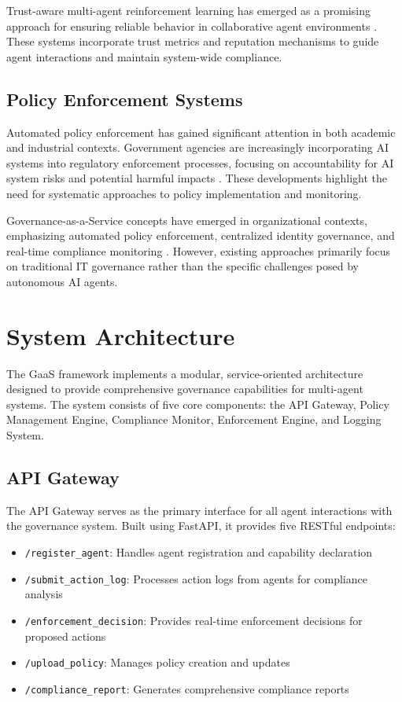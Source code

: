 \documentclass[letterpaper]{article}
\begin{document}
Trust-aware multi-agent reinforcement learning has emerged as a promising approach for ensuring reliable behavior in collaborative agent environments \cite{trust2024marl}. These systems incorporate trust metrics and reputation mechanisms to guide agent interactions and maintain system-wide compliance.

\subsection{Policy Enforcement Systems}

Automated policy enforcement has gained significant attention in both academic and industrial contexts. Government agencies are increasingly incorporating AI systems into regulatory enforcement processes, focusing on accountability for AI system risks and potential harmful impacts \cite{gov2024ai}. These developments highlight the need for systematic approaches to policy implementation and monitoring.

Governance-as-a-Service concepts have emerged in organizational contexts, emphasizing automated policy enforcement, centralized identity governance, and real-time compliance monitoring \cite{gaas2024org}. However, existing approaches primarily focus on traditional IT governance rather than the specific challenges posed by autonomous AI agents.

\section{System Architecture}

The GaaS framework implements a modular, service-oriented architecture designed to provide comprehensive governance capabilities for multi-agent systems. The system consists of five core components: the API Gateway, Policy Management Engine, Compliance Monitor, Enforcement Engine, and Logging System.

\subsection{API Gateway}

The API Gateway serves as the primary interface for all agent interactions with the governance system. Built using FastAPI, it provides five RESTful endpoints:

\begin{itemize}
\item \texttt{/register\_agent}: Handles agent registration and capability declaration
\item \texttt{/submit\_action\_log}: Processes action logs from agents for compliance analysis
\item \texttt{/enforcement\_decision}: Provides real-time enforcement decisions for proposed actions
\item \texttt{/upload\_policy}: Manages policy creation and updates
\item \texttt{/compliance\_report}: Generates comprehensive compliance reports
\end{itemize}
\end{document}

